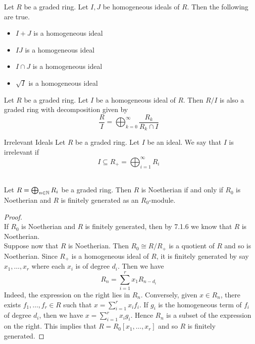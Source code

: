 \documentclass[a4paper]{article}
\begin{document}
\begin{lmm}{}{} Let $R$ be a graded ring. Let $I,J$ be homogeneous ideals of $R$. Then the following are true. 
\begin{itemize}
\item $I+J$ is a homogeneous ideal
\item $IJ$ is a homogeneous ideal
\item $I\cap J$ is a homogeneous ideal
\item $\sqrt{I}$ is a homogeneous ideal
\end{itemize}
\end{lmm}

\begin{prp}{}{} Let $R$ be a graded ring. Let $I$ be a homogeneous ideal of $R$. Then $R/I$ is also a graded ring with decomposition given by $$\frac{R}{I}=\bigoplus_{k=0}^\infty\frac{R_k}{R_k\cap I}$$
\end{prp}

\begin{defn}{Irrelevant Ideals}{} Let $R$ be a graded ring. Let $I$ be an ideal. We say that $I$ is irrelevant if $$I\subseteq R_+=\bigoplus_{i=1}^\infty R_i$$
\end{defn}

\begin{prp}{}{}\\ Let $R=\bigoplus_{n\in\mathbb{N}}R_i$ be a graded ring. Then $R$ is Noetherian if and only if $R_0$ is Noetherian and $R$ is finitely generated as an $R_0$-module. 
\begin{proof}\\
If $R_0$ is Noetherian and $R$ is finitely generated, then by 7.1.6 we know that $R$ is Noetherian. \\

Suppose now that $R$ is Noetherian. Then $R_0\cong R/R_+$ is a quotient of $R$ and so is Noetherian. Since $R_+$ is a homogeneous ideal of $R$, it is finitely generated by say $x_1,\dots,x_r$ where each $x_i$ is of degree $d_i$. Then we have $$R_n=\sum_{i=1}^r x_1R_{n-{d_i}}$$ Indeed, the expression on the right lies in $R_n$. Conversely, given $x\in R_n$, there exists $f_1,\dots,f_r\in R$ such that $x=\sum_{i=1}^rx_if_i$. If $g_i$ is the homogeneous term of $f_i$ of degree $d_i$, then we have $x=\sum_{i=1}^rx_ig_i$. Hence $R_n$ is a subset of the expression on the right. This implies that $R=R_0[x_1,\dots,x_r]$ and so $R$ is finitely generated. 
\end{proof}
\end{prp}
\end{document}

